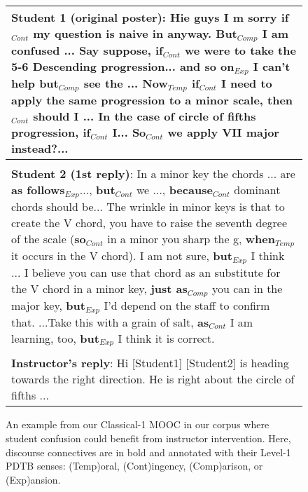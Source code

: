 \documentclass[letterpaper]{article}
\begin{document}
\begin{figure}
\small 
\begin{tabular}{|p{7.8cm}|}
\hline 

\textbf{Student 1 (original poster)}: Hie guys I m sorry
\textbf{if}$_{Cont}$ my question is naive in
anyway. \textbf{But}$_{Comp}$ I am confused ...  Say suppose,
\textbf{if}$_{Cont}$ we were to take the 5-6 Descending
progression...  \textbf{and so on}$_{Exp}$ I can’t help
\textbf{but}$_{Comp}$ see the ...  \textbf{Now}$_{Temp}$ {\bf
if}$_{Cont}$ I need to apply the same progression to a minor
scale, \textbf{then}$_{Cont}$ should I ... In the case of circle
of fifths progression, \textbf{if}$_{Cont}$
I... \textbf{So}$_{Cont}$ we apply VII major instead?... \\

\hline \\

\textbf{Student 2 (1st reply)}: In a minor key the chords ... are
\textbf{as follows}$_{Exp}$..., \textbf{but}$_{Cont}$ we ...,
\textbf{because}$_{Cont}$ dominant chords should be... The
wrinkle in minor keys is that to create the V chord, you have to
raise the seventh degree of the scale (\textbf{so}$_{Cont}$ in a
minor you sharp the g, \textbf{when$_{Temp}$} it occurs in the V
chord). I am not sure, \textbf{but}$_{Exp}$ I think ... I believe
you can use that chord as an substitute for the V chord in a
minor key, \textbf{just as}$_{Comp}$ you can in the major key,
\textbf{but}$_{Exp}$ I'd depend on the staff to confirm
that. ...Take this with a grain of salt, \textbf{as}$_{Cont}$ I
am learning, too, \textbf{but}$_{Exp}$ I think it is correct. \\

\hline \\

\textbf{Instructor's reply}: Hi [Student1] [Student2] is heading towards 
the right direction. He is right about the circle of fifths ...  \\

\hline
\end{tabular}
\caption{An example from our {\sc Classical-1} MOOC in our corpus
  where student confusion could benefit from instructor intervention.
  Here, discourse connectives are in bold and annotated with their
  Level-1 PDTB senses: (Temp)oral, (Cont)ingency, (Comp)arison, or
  (Exp)ansion.}
\vspace{-4mm}
\label{fig:example-intro}
\end{figure}
\end{document}
